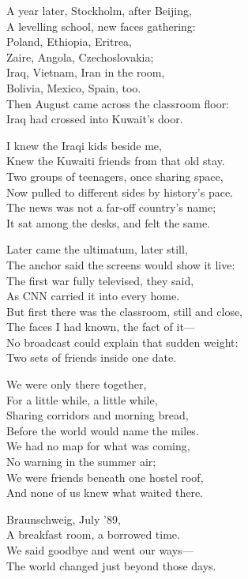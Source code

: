 \begin{lyrics}
A year later, Stockholm, after Beijing,\\
A levelling school, new faces gathering:\\
Poland, Ethiopia, Eritrea,\\
Zaire, Angola, Czechoslovakia;\\
Iraq, Vietnam, Iran in the room,\\
Bolivia, Mexico, Spain, too.\\
Then August came across the classroom floor:\\
Iraq had crossed into Kuwait’s door.

I knew the Iraqi kids beside me,\\
Knew the Kuwaiti friends from that old stay.\\
Two groups of teenagers, once sharing space,\\
Now pulled to different sides by history’s pace.\\
The news was not a far-off country’s name;\\
It sat among the desks, and felt the same.

Later came the ultimatum, later still,\\
The anchor said the screens would show it live:\\
The first war fully televised, they said,\\
As CNN carried it into every home.\\
But first there was the classroom, still and close,\\
The faces I had known, the fact of it—\\
No broadcast could explain that sudden weight:\\
Two sets of friends inside one date.

We were only there together,\\
For a little while, a little while,\\
Sharing corridors and morning bread,\\
Before the world would name the miles.\\
We had no map for what was coming,\\
No warning in the summer air;\\
We were friends beneath one hostel roof,\\
And none of us knew what waited there.

Braunschweig, July ’89,\\
A breakfast room, a borrowed time.\\
We said goodbye and went our ways—\\
The world changed just beyond those days.
\end{lyrics}

